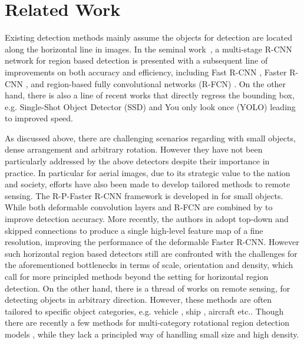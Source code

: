 \documentclass[10pt,twocolumn,letterpaper]{article}
\begin{document}
	


\section{Related Work}
Existing detection methods mainly assume the objects for detection are located along the horizontal line in images. In the seminal work~\cite{girshick2014rich}, a multi-stage R-CNN network for region based detection is presented with a subsequent line of improvements on both accuracy and efficiency, including Fast R-CNN \cite{girshick2015fast}, Faster R-CNN \cite{ren2017faster}, and region-based fully convolutional networks (R-FCN) \cite{dai2016r}. On the other hand, there is also a line of recent works that directly regress the bounding box, e.g. Single-Shot Object Detector (SSD) \cite{liu2016ssd} and You only look once (YOLO) \cite{redmon2016you} leading to improved speed.
	
	As discussed above, there are challenging scenarios regarding with small objects, dense arrangement and arbitrary rotation. However they have not been particularly addressed by the above detectors despite their importance in practice. In particular for aerial images, due to its strategic value to the nation and society, efforts have also been made to develop tailored methods to remote sensing. The R-P-Faster R-CNN framework is developed in \cite{han2017efficient} for small objects. While both deformable convolution layers \cite{dai2017deformable} and R-FCN are combined by \cite{xu2017deformable} to improve detection accuracy. More recently, the authors in \cite{xu2017deformable} adopt top-down and skipped connections to produce a single high-level feature map of a fine resolution, improving the performance of the deformable Faster R-CNN. However such horizontal region based detectors still are confronted with the challenges for the aforementioned bottlenecks in terms of scale, orientation and density, which call for more principled methods beyond the setting for horizontal region detection. On the other hand, there is a thread of works on remote sensing, for detecting objects in arbitrary direction. However, these methods are often tailored to specific object categories, e.g. vehicle \cite{tang2017arbitrary}, ship \cite{yang2018automatic, yang2018position,liu2017rotated,zhang2018toward,liu2018arbitrary}, aircraft \cite{liu2017learning} etc.. Though there are recently a few methods for multi-category rotational region detection models \cite{azimi2018towards, ding2018learning}, while they lack a principled way of handling small size and high density.
	
\end{document}
